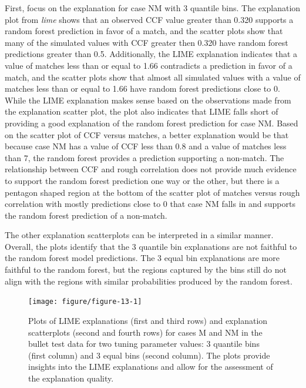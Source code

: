 \documentclass[AMS,STIX2COL]{WileyNJD-v2}\usepackage[]{graphicx}\usepackage[]{color}
\newenvironment{knitrout}{}{} %
\begin{document}
First, focus on the explanation for case NM with 3 quantile bins. The explanation plot from \emph{lime} shows that an observed CCF value greater than 0.320 supports a random forest prediction in favor of a match, and the scatter plots show that many of the simulated values with CCF greater then 0.320 have random forest predictions greater than 0.5. Additionally, the LIME explanation indicates that a value of matches less than or equal to 1.66 contradicts a prediction in favor of a match, and the scatter plots show that almost all simulated values with a value of matches less than or equal to 1.66 have random forest predictions close to 0. While the LIME explanation makes sense based on the observations made from the explanation scatter plot, the plot also indicates that LIME falls short of providing a good explanation of the random forest prediction for case NM. Based on the scatter plot of CCF versus matches, a better explanation would be that because case NM has a value of CCF less than 0.8 and a value of matches less than 7, the random forest provides a prediction supporting a non-match. The relationship between CCF and rough correlation does not provide much evidence to support the random forest prediction one way or the other, but there is a pentagon shaped region at the bottom of the scatter plot of matches versus rough correlation with mostly predictions close to 0 that case NM falls in and supports the random forest prediction of a non-match.

The other explanation scatterplots can be interpreted in a similar manner. Overall, the plots identify that the 3 quantile bin explanations are not faithful to the random forest model predictions. The 3 equal bin explanations are more faithful to the random forest, but the regions captured by the bins still do not align with the regions with similar probabilities produced by the random forest.

\begin{figure}[!thp]
\begin{knitrout}
\color{fgcolor}

{\centering \texttt{[image: figure/figure-13-1]} 

}



\end{knitrout}
\caption{Plots of LIME explanations (first and third rows) and explanation scatterplots (second and fourth rows) for  cases M and NM in the bullet test data for two tuning parameter values: 3 quantile bins (first column) and 3 equal bins (second column).  The plots provide insights into the LIME explanations and allow for the assessment of the explanation quality.}
\label{fig:figure-13}
\end{figure}
\end{document}
